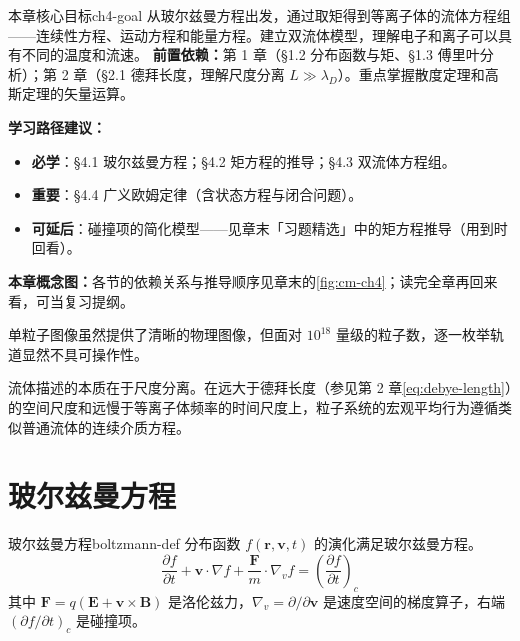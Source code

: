 \documentclass[12pt,a4paper,openany,oneside]{book}
\newcommand{\diffmarktext}[1]{%
  \textcolor{coverMid!80}{\rule[-0.1em]{2pt}{0.9em}}\,%
  \textcolor{coverMid}{\footnotesize\textbf{[#1]}}%
}
\newcommand{\difficulty}[1]{\marginnote{\raggedright\diffmarktext{#1}}}
\newcommand{\vect}[1]{\bm{#1}}
\newcommand{\grad}{\nabla}
\begin{document}
\begin{insight}{本章核心目标}{ch4-goal}
从玻尔兹曼方程出发，通过取矩得到等离子体的流体方程组——连续性方程、运动方程和能量方程。建立双流体模型，理解电子和离子可以具有不同的温度和流速。
\tcblower
\textbf{前置依赖：}第 1 章（\S 1.2 分布函数与矩、\S 1.3 傅里叶分析）；第 2 章（\S 2.1 德拜长度，理解尺度分离 $L\gg\lambda_D$）。重点掌握散度定理和高斯定理的矢量运算。

\textbf{学习路径建议：}

\begin{itemize}[leftmargin=*]
\item[\textcolor{red}{$\blacksquare$}] \textbf{必学}：\S 4.1 玻尔兹曼方程；\S 4.2 矩方程的推导；\S 4.3 双流体方程组。
\item[\textcolor{orange}{$\blacksquare$}] \textbf{重要}：\S 4.4 广义欧姆定律（含状态方程与闭合问题）。
\item[\textcolor{green}{$\blacksquare$}] \textbf{可延后}：碰撞项的简化模型——见章末「习题精选」中的矩方程推导（用到时回看）。
\end{itemize}
\textbf{本章概念图：}各节的依赖关系与推导顺序见章末的\cref{fig:cm-ch4}；读完全章再回来看，可当复习提纲。
\end{insight}

单粒子图像虽然提供了清晰的物理图像，但面对 $10^{18}$ 量级的粒子数，逐一枚举轨道显然不具可操作性。

流体描述的本质在于尺度分离。在远大于德拜长度（参见第 2 章\cref{eq:debye-length}）的空间尺度和远慢于等离子体频率的时间尺度上，粒子系统的宏观平均行为遵循类似普通流体的连续介质方程。

\section{玻尔兹曼方程}\difficulty{基础}

\begin{definition}{玻尔兹曼方程}{boltzmann-def}
分布函数 $f(\vect{r},\vect{v},t)$ 的演化满足玻尔兹曼方程。
\[
\frac{\partial f}{\partial t} + \vect{v}\cdot\grad f + \frac{\vect{F}}{m}\cdot\grad_v f = \left(\frac{\partial f}{\partial t}\right)_c
\]
其中 $\vect{F} = q(\vect{E} + \vect{v}\times\vect{B})$ 是洛伦兹力，$\grad_v = \partial/\partial\vect{v}$ 是速度空间的梯度算子，右端 $(\partial f/\partial t)_c$ 是碰撞项。
\end{definition}
\end{document}
